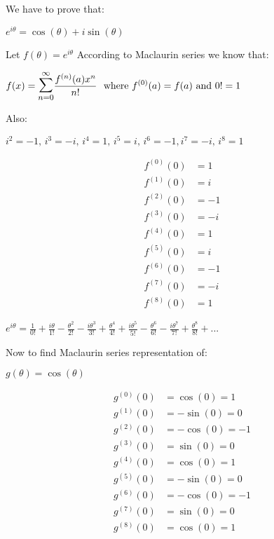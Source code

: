\documentclass[14pt]{extreport}
\begin{document}
{}


{}
\text{ }
\newline

We have to prove that:
\newline

$\displaystyle e^{i\theta} = \cos{(\theta)} + i\sin{(\theta)}$
\newline


Let $\displaystyle f(\theta) = e^{i\theta}$ According to Maclaurin series we know that:

$\displaystyle f(x) = \mathlarger{\mathlarger{\sum}}\limits_{n = 0}^{\infty}\frac{f^{(n)}(a)x^n}{n!}\,\, \text{ where } f^{(0)}(a) = f(a) \text{ and } 0! = 1$
\newline


Also:
\newline

$i^{2} = -1,\, i^{3} = -i,\, i^{4} = 1,\, i^{5} = i,\, i^{6} = -1, i^{7} = -i,\, i^{8} = 1$
\newline

\begin{align*}f^{(0)}(0) &= 1\\ f^{(1)}(0) &= i\\ f^{(2)}(0) &= -1\\f^{(3)}(0) &= -i\\ f^{(4)}(0) &= 1\\ f^{(5)}(0) &=  i \\ f^{(6)}(0) &= -1\\f^{(7)}(0) &= -i\\ f^{(8)}(0) &= 1\end{align*}


$\displaystyle e^{i\theta} = \frac{1}{0!} + \frac{i\theta}{1!}  - \frac{\theta^{2}}{2!} - \frac{i\theta^{3}}{3!} + \frac{\theta^{4}}{4!} +  \frac{i\theta^{5}}{5!} - \frac{\theta^{6}}{6!} - \frac{i\theta^{7}}{7!} + \frac{\theta^{8}}{8!} + ...$
\newline

Now to find Maclaurin series representation of:
\newline

$\displaystyle g(\theta) = \cos{(\theta)}$
\newline

\begin{align*}g^{(0)}(0) &= \cos{(0)} = 1\\ g^{(1)}(0) &= -\sin{(0)} = 0 \\ g^{(2)}(0) &= -\cos{(0)} = -1 \\ g^{(3)}(0) &= \sin{(0)} = 0 \\ g^{(4)}(0) &= \cos{(0)} = 1 \\ g^{(5)}(0) &= -\sin{(0)} = 0 \\ g^{(6)}(0) &= -\cos{(0)} = -1 \\ g^{(7)}(0) &= \sin{(0)} = 0 \\g^{(8)}(0) &= \cos{(0)} = 1  \end{align*}
\end{document}
